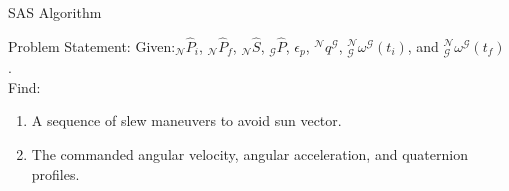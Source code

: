 \documentclass{beamer}
\begin{document}
\begin{frame}{SAS Algorithm}
	\begin{block}{Problem Statement:}
		Given:$_\mathcal{N}\hat{P}_i$, $_\mathcal{N}\hat{P}_f$, $_\mathcal{N}\hat{S}$, $_\mathcal{G}\hat{P}$, $\epsilon_p$, $^\mathcal{N}q^\mathcal{G}$, $^\mathcal{N}_\mathcal{G}\omega^\mathcal{G}(t_i)$, and $^\mathcal{N}_\mathcal{G}\omega^\mathcal{G}(t_f)$ .\\
		Find: 
		\begin{enumerate}
			\item A sequence of slew maneuvers to avoid sun vector.
			\item The commanded angular velocity, angular acceleration, and quaternion profiles.
		\end{enumerate} 
	\end{block}
\end{frame}
\end{document}

